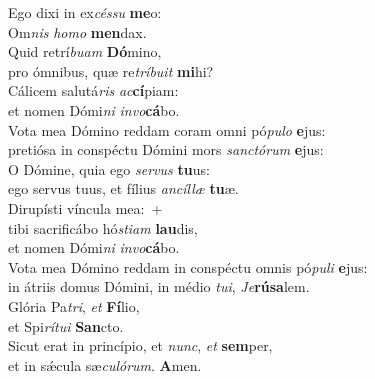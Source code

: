 \evenverse Ego dixi in ex\textit{cés}\textit{su} \textbf{me}o:~\*\\
\evenverse Om\textit{nis} \textit{ho}\textit{mo} \textbf{men}dax.\\
\oddverse Quid retrí\textit{bu}\textit{am} \textbf{Dó}mino,~\*\\
\oddverse pro ómnibus, quæ re\textit{trí}\textit{bu}\textit{it} \textbf{mi}hi?\\
\evenverse Cálicem salutá\textit{ris} \textit{ac}\textbf{cí}piam:~\*\\
\evenverse et nomen Dómi\textit{ni} \textit{in}\textit{vo}\textbf{cá}bo.\\
\oddverse Vota mea Dómino reddam coram omni pó\textit{pu}\textit{lo} \textbf{e}jus:~\*\\
\oddverse pretiósa in conspéctu Dómini mors \textit{san}\textit{ctó}\textit{rum} \textbf{e}jus:\\
\evenverse O Dómine, quia ego \textit{ser}\textit{vus} \textbf{tu}us:~\*\\
\evenverse ego servus tuus, et fílius \textit{an}\textit{cíl}\textit{læ} \textbf{tu}æ.\\
\oddverse Dirupísti víncula mea:~+\\
\oddverse  tibi sacrificábo hó\textit{sti}\textit{am} \textbf{lau}dis,~\*\\
\oddverse et nomen Dómi\textit{ni} \textit{in}\textit{vo}\textbf{cá}bo.\\
\evenverse Vota mea Dómino reddam in conspéctu omnis pó\textit{pu}\textit{li} \textbf{e}jus:~\*\\
\evenverse in átriis domus Dómini, in médio \textit{tu}\textit{i}, \textit{Je}\textbf{rú}\textbf{sa}lem.\\
\oddverse Glória Pa\textit{tri}, \textit{et} \textbf{Fí}lio,~\*\\
\oddverse et Spi\textit{rí}\textit{tu}\textit{i} \textbf{San}cto.\\
\evenverse Sicut erat in princípio, et \textit{nunc}, \textit{et} \textbf{sem}per,~\*\\
\evenverse et in sǽcula sæ\textit{cu}\textit{ló}\textit{rum}. \textbf{A}men.\\
